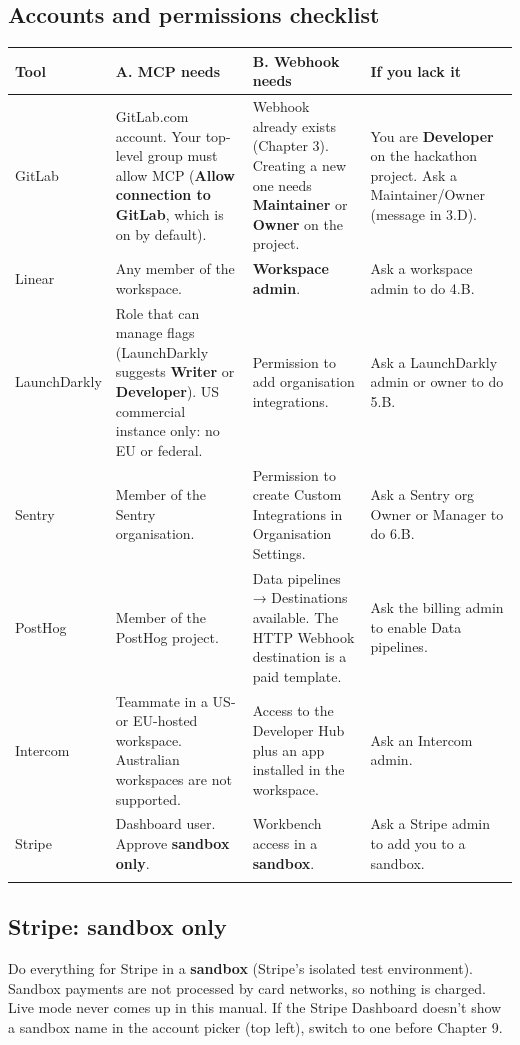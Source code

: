 \documentclass[11pt,a4paper]{article}
\newcommand{\ui}[1]{\textbf{#1}}
\begin{document}
\subsection{Accounts and permissions checklist}
\begin{longtable}{@{}L{25mm}L{44mm}L{43mm}L{44mm}@{}}
\toprule
\textbf{Tool} & \textbf{A. MCP needs} & \textbf{B. Webhook needs} & \textbf{If you lack it}\\
\midrule
\endhead
GitLab & GitLab.com account. Your top-level group must allow MCP (\ui{Allow connection to GitLab}, which is on by default). & Webhook already exists (Chapter 3). Creating a new one needs \textbf{Maintainer} or \textbf{Owner} on the project. & You are \textbf{Developer} on the hackathon project. Ask a Maintainer/Owner (message in 3.D).\\\addlinespace[3pt]
Linear & Any member of the workspace. & \textbf{Workspace admin}. & Ask a workspace admin to do 4.B.\\\addlinespace[3pt]
Launch\-Darkly & Role that can manage flags (LaunchDarkly suggests \textbf{Writer} or \textbf{Developer}). US commercial instance only: no EU or federal. & Permission to add organisation integrations. & Ask a LaunchDarkly admin or owner to do 5.B.\\\addlinespace[3pt]
Sentry & Member of the Sentry organisation. & Permission to create Custom Integrations in Organisation Settings. & Ask a Sentry org Owner or Manager to do 6.B.\\\addlinespace[3pt]
PostHog & Member of the PostHog project. & Data pipelines → Destinations available. The HTTP Webhook destination is a paid template. & Ask the billing admin to enable Data pipelines.\\\addlinespace[3pt]
Intercom & Teammate in a US- or EU-hosted workspace. Australian workspaces are not supported. & Access to the Developer Hub plus an app installed in the workspace. & Ask an Intercom admin.\\\addlinespace[3pt]
Stripe & Dashboard user. Approve \textbf{sandbox only}. & Workbench access in a \textbf{sandbox}. & Ask a Stripe admin to add you to a sandbox.\\\addlinespace[3pt]
\bottomrule
\end{longtable}

\subsection{Stripe: sandbox only}
Do everything for Stripe in a \textbf{sandbox} (Stripe's isolated test environment). Sandbox payments are not processed by card networks, so nothing is charged. Live mode never comes up in this manual. If the Stripe Dashboard doesn't show a sandbox name in the account picker (top left), switch to one before Chapter 9.
\end{document}

